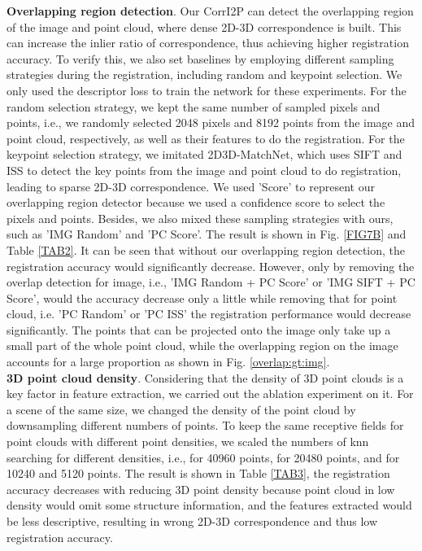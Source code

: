 \documentclass[lettersize,journal]{IEEEtran}
\begin{document}
\noindent\textbf{Overlapping region detection}.
Our CorrI2P can detect the overlapping region of the image and point cloud, where dense 2D-3D correspondence is built. This can increase the inlier ratio of correspondence, thus achieving higher registration accuracy. To verify this, we also set baselines by employing different sampling strategies during the registration, including random and keypoint selection. We only used the descriptor loss to train the network for these experiments. For the random selection strategy, we kept the same number of sampled pixels and points, i.e., we randomly selected 2048 pixels and 8192 points from the image and point cloud, respectively, as well as their features to do the registration. For the keypoint selection strategy,  we imitated 2D3D-MatchNet, which uses SIFT and ISS to detect the key points from the image and point cloud to do registration, leading to sparse 2D-3D correspondence. We used 'Score' to represent our overlapping region detector because we used a confidence score to select the pixels and points. Besides, we also mixed these sampling strategies with ours, such as 'IMG Random' and 'PC Score'. The result is shown in Fig. \ref{FIG7B} and Table \ref{TAB2}. It can be seen that without our overlapping region detection, the registration accuracy would significantly decrease. However, only by removing the overlap detection for image, i.e., 'IMG Random + PC Score' or 'IMG SIFT + PC Score', would the accuracy decrease only a little while removing that for point cloud, i.e. 'PC Random' or 'PC ISS' the registration performance would decrease significantly. The points that can be projected onto the image only take up a small part of the whole point cloud, while the overlapping region on the image accounts for a large proportion as shown in Fig. \ref{overlap:gt:img}. \\

\noindent\textbf{3D point cloud density}. Considering that the density of 3D point clouds is a key factor in feature extraction, we carried out the ablation experiment on it. For a scene of the same size, we changed the density of the point cloud by downsampling different numbers of points. To keep the same receptive fields for point clouds with different point densities, we scaled the numbers of knn searching for different densities, i.e.,  for 40960 points,  for 20480 points, and  for 10240 and 5120 points. The result is shown in Table \ref{TAB3}, the registration accuracy decreases with reducing 3D point density because point cloud in low density would omit some structure information, and the features extracted would be less descriptive, resulting in wrong 2D-3D correspondence and thus low registration accuracy.
\end{document}
